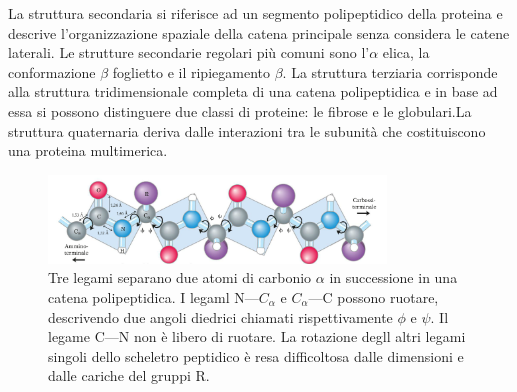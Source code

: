 La struttura secondaria si riferisce ad un segmento polipeptidico della proteina e descrive l'organizzazione spaziale della catena principale senza considera le catene laterali. Le strutture secondarie regolari più comuni sono l'$\alpha$ elica, la conformazione $\beta$ foglietto e il ripiegamento $\beta$. La struttura terziaria corrisponde alla struttura tridimensionale completa di una catena polipeptidica e in base ad essa si possono distinguere due classi di proteine: le fibrose e le globulari.La struttura quaternaria deriva dalle interazioni tra le subunità che costituiscono una proteina multimerica. 

\begin{figure}
	\centering
	\includegraphics[width=0.8\textwidth]{Immagini/Gruppopeptidicoplanare.png}
	\caption{Tre legami separano due atomi di carbonio $\alpha$ in successione in una catena polipeptidica. I legaml N---$C_\alpha$ e $C_\alpha$---C possono ruotare, descrivendo due angoli diedrici chiamati rispettivamente $\phi$ e $\psi$. Il legame C---N non è libero di ruotare. La rotazione degll altri legami singoli dello scheletro peptidico è resa difficoltosa dalle dimensioni e dalle cariche del gruppi R.}
	\label{fig:gruppopeptidico}
\end{figure}


